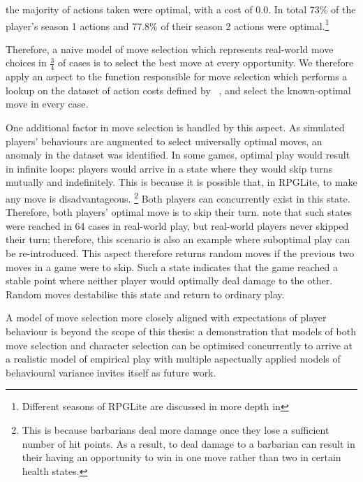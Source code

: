 \begin{displayquote}
  [\ldots{}] the majority of actions taken were optimal, with a cost of 0.0. In
  total 73\% of the player’s season 1 actions and 77.8\% of their season 2
  actions were optimal.\footnote{Different seasons of RPGLite are discussed in
  more depth in }
\end{displayquote}

Therefore, a naive model of move selection which represents real-world move
choices in \(\frac{3}{4}\) of cases is to select the best move at every
opportunity. We therefore apply an aspect to the function responsible for move
selection which performs a lookup on the dataset of action costs defined by
\citeauthor{kavanagh2021gameplay}~\cite{kavanagh2021gameplay}, and select the
known-optimal move in every case.

One additional factor in move selection is handled by this aspect. As simulated
players' behaviours are augmented to select universally optimal moves, an
anomaly in the dataset was identified. In some games, optimal play would result
in infinite loops: players would arrive in a state where they would skip turns
mutually and indefinitely. This is because it is possible that, in RPGLite, to
make any move is disadvantageous. \footnote{This is because barbarians deal more
damage once they lose a sufficient number of hit points. As a result, to deal
damage to a barbarian can result in their having an opportunity to win in one
move rather than two in certain health states.} Both players can concurrently
exist in this state. Therefore, both players' optimal move is to skip their
turn. \citeauthor{kavanagh2021gameplay} note that such states were reached in 64
cases in real-world play, but real-world players never skipped their turn;
therefore, this scenario is also an example where suboptimal play can be
re-introduced. This aspect therefore returns random moves if the previous two
moves in a game were to skip. Such a state indicates that the game reached a
stable point where neither player would optimally deal damage to the other.
Random moves destabilise this state and return to ordinary play.

A model of move selection more closely aligned with expectations of player
behaviour is beyond the scope of this thesis: a demonstration that models of
both move selection and character selection can be optimised concurrently to
arrive at a realistic model of empirical play with multiple aspectually applied
models of behavioural variance invites itself as future work.



